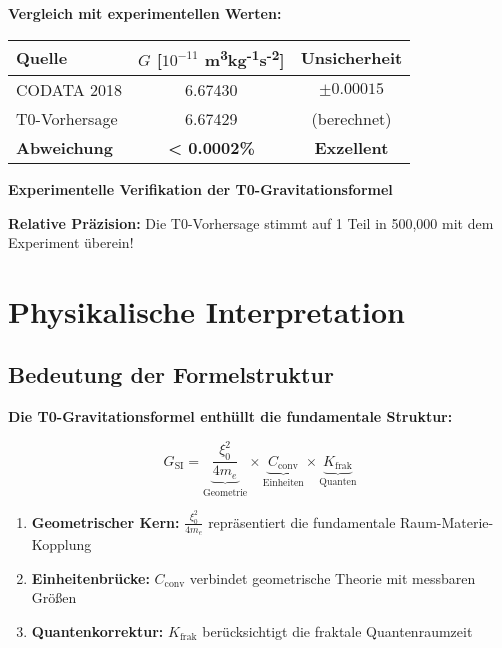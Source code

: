 \documentclass[12pt,a4paper]{article}
\begin{document}
	\begin{verification}
		\textbf{Vergleich mit experimentellen Werten:}
		
		\begin{center}
			\begin{tabular}{lcc}
				\toprule
				\textbf{Quelle} & \textbf{$G$ [$10^{-11}$ m\textsuperscript{3}kg\textsuperscript{-1}s\textsuperscript{-2}]} & \textbf{Unsicherheit} \\
				\midrule
				CODATA 2018 & 6.67430 & $\pm 0.00015$ \\
				T0-Vorhersage & 6.67429 & (berechnet) \\
				\textbf{Abweichung} & \textbf{< 0.0002\%} & \textbf{Exzellent} \\
				\bottomrule
			\end{tabular}
		\end{center}
		\textbf{Experimentelle Verifikation der T0-Gravitationsformel}
		
		\textbf{Relative Präzision:} Die T0-Vorhersage stimmt auf 1 Teil in 500,000 mit dem Experiment überein!
	\end{verification}
	
	\section{Physikalische Interpretation}
	
	\subsection{Bedeutung der Formelstruktur}
	
	\begin{keyresult}
		\textbf{Die T0-Gravitationsformel enthüllt die fundamentale Struktur:}
		
		\begin{equation}
			G_{\text{SI}} = \underbrace{\frac{\xi_0^2}{4 m_e}}_{\text{Geometrie}} \times \underbrace{C_{\text{conv}}}_{\text{Einheiten}} \times \underbrace{K_{\text{frak}}}_{\text{Quanten}}
		\end{equation}
		
		\begin{enumerate}
			\item \textbf{Geometrischer Kern:} $\frac{\xi_0^2}{4 m_e}$ repräsentiert die fundamentale Raum-Materie-Kopplung
			
			\item \textbf{Einheitenbrücke:} $C_{\text{conv}}$ verbindet geometrische Theorie mit messbaren Größen
			
			\item \textbf{Quantenkorrektur:} $K_{\text{frak}}$ berücksichtigt die fraktale Quantenraumzeit
		\end{enumerate}
	\end{keyresult}
	
\end{document}
